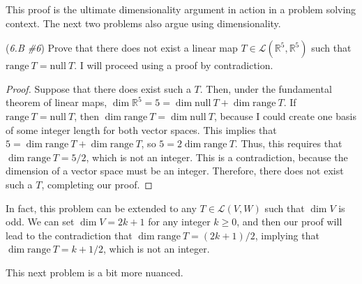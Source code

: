 \documentclass{article}
\renewcommand{\L}{\mathcal{L}}
\newcommand{\nulls}{\mathrm{null}}
\newcommand{\range}{\mathrm{range}\ }
\newcommand{\R}{\mathbb{R}}
\theoremstyle{definition}
\begin{document}
This proof is the ultimate dimensionality argument in action in a problem solving context. The next two problems also argue using dimensionality.
\begin{problem}{(\textit{6.B \#6}) Prove that there does not exist a linear map $T \in \L(\R^5, \R^5)$ such that $\range T = \nulls\ T$.}
    I will proceed using a proof by contradiction. 
    \begin{proof}
        Suppose that there does exist such a $T$. Then, under the fundamental theorem of linear maps, $\dim \R^5 = 5 = \dim \nulls\ T + \dim \range T$. If $\range T = \nulls\ T$, then $\dim \range T = \dim \nulls\ T$, because I could create one basis of some integer length for both vector spaces. This implies that $5 = \dim \range T + \dim \range T$, so $5 = 2\dim \range T$. Thus, this requires that $\dim \range T = 5/2$, which is not an integer. This is a contradiction, because the dimension of a vector space must be an integer. Therefore, there does not exist such a $T$, completing our proof. 
    \end{proof}
    In fact, this problem can be extended to any $T \in \L(V, W)$ such that $\dim V$ is odd. We can set $\dim V = 2k + 1$ for any integer $k \geq 0$, and then our proof will lead to the contradiction that $\dim \range T = (2k + 1)/2$, implying that $\dim \range T = k + 1/2$, which is not an integer. 
\end{problem}
This next problem is a bit more nuanced.
\end{document}
